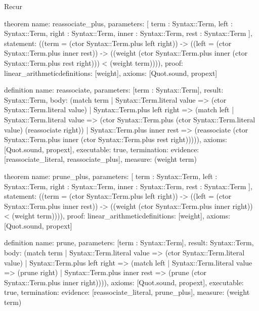 \begin{lexlean}{Recur}
\begin{semanticmodule}
theorem{
  name: reassociate_plus,
  parameters: [
    term : Syntax::Term,
    left : Syntax::Term,
    right : Syntax::Term,
    inner : Syntax::Term,
    rest : Syntax::Term
  ],
  statement: ((term = (ctor Syntax::Term.plus left right)) -> ((left = (ctor Syntax::Term.plus inner rest)) -> ((weight (ctor Syntax::Term.plus inner (ctor Syntax::Term.plus rest right))) < (weight term)))),
  proof: linear_arithmetic{definitions: [weight]},
  axioms: [Quot.sound, propext]
}

definition{
  name: reassociate,
  parameters: [term : Syntax::Term],
  result: Syntax::Term,
  body: (match term
    | Syntax::Term.literal value => (ctor Syntax::Term.literal value)
    | Syntax::Term.plus left right => (match left
      | Syntax::Term.literal value => (ctor Syntax::Term.plus (ctor Syntax::Term.literal value) (reassociate right))
      | Syntax::Term.plus inner rest => (reassociate (ctor Syntax::Term.plus inner (ctor Syntax::Term.plus rest right))))),
  axioms: [Quot.sound, propext],
  executable: true,
  termination: {evidence: [reassociate_literal, reassociate_plus], measure: (weight term)}
}

theorem{
  name: prune_plus,
  parameters: [
    term : Syntax::Term,
    left : Syntax::Term,
    right : Syntax::Term,
    inner : Syntax::Term,
    rest : Syntax::Term
  ],
  statement: ((term = (ctor Syntax::Term.plus left right)) -> ((left = (ctor Syntax::Term.plus inner rest)) -> ((weight (ctor Syntax::Term.plus inner right)) < (weight term)))),
  proof: linear_arithmetic{definitions: [weight]},
  axioms: [Quot.sound, propext]
}

definition{
  name: prune,
  parameters: [term : Syntax::Term],
  result: Syntax::Term,
  body: (match term
    | Syntax::Term.literal value => (ctor Syntax::Term.literal value)
    | Syntax::Term.plus left right => (match left
      | Syntax::Term.literal value => (prune right)
      | Syntax::Term.plus inner rest => (prune (ctor Syntax::Term.plus inner right)))),
  axioms: [Quot.sound, propext],
  executable: true,
  termination: {evidence: [reassociate_literal, prune_plus], measure: (weight term)}
}


\end{semanticmodule}
\end{lexlean}
